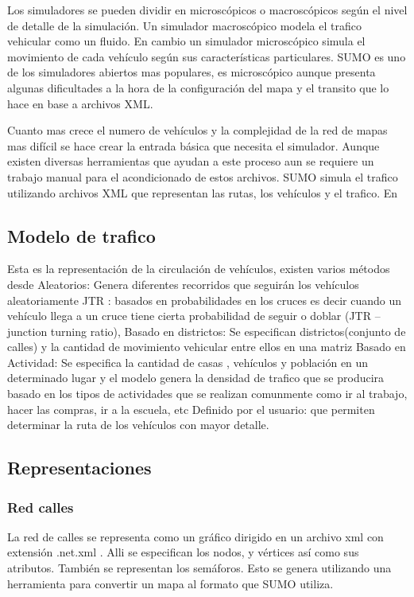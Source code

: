 Los simuladores se pueden dividir en microscópicos o macroscópicos según el nivel de detalle de la simulación. Un simulador macroscópico modela  el trafico vehicular como un fluido. En cambio un simulador microscópico simula el movimiento de cada vehículo según sus características particulares.
SUMO es uno de los simuladores abiertos mas populares,  es microscópico aunque presenta algunas dificultades a la hora de la configuración del mapa y el transito que lo hace en base a archivos XML.

Cuanto mas crece el numero de vehículos y la complejidad de la red de mapas mas difícil se hace crear la entrada básica que necesita el simulador. Aunque existen diversas herramientas que ayudan a este proceso aun se requiere un trabajo manual para el acondicionado de estos archivos.
SUMO simula el trafico utilizando archivos XML que representan las rutas, los vehículos y el trafico. En 

\subsection{Modelo de trafico }
Esta es la representación de la circulación de vehículos, existen varios métodos desde 
Aleatorios: Genera diferentes recorridos que seguirán los vehículos aleatoriamente
JTR : basados en probabilidades en los cruces  es decir cuando un vehículo llega a un cruce tiene cierta probabilidad de seguir o doblar (JTR – junction turning ratio), 
Basado en districtos:  Se especifican districtos(conjunto de calles) y  la cantidad de movimiento vehicular entre ellos en una  matriz
Basado en Actividad: Se especifica la cantidad de casas , vehículos y población en un determinado lugar y el modelo genera la densidad de trafico que se producira basado en los tipos de actividades que se realizan comunmente como ir al trabajo, hacer las compras, ir a la escuela,  etc
Definido por el usuario: que permiten determinar la ruta de los vehículos con mayor detalle.

\subsection{Representaciones}

\subsubsection{Red calles}
La red de calles se representa como un gráfico dirigido en un archivo xml con extensión .net.xml . Alli se especifican los nodos, y vértices así como sus atributos. También se representan los semáforos. Esto  se genera utilizando una herramienta  para convertir un mapa al formato que SUMO utiliza.

